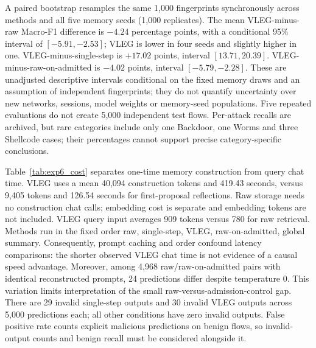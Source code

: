 A paired bootstrap resamples the same 1,000 fingerprints synchronously across methods and all five memory seeds (1,000 replicates). The mean VLEG-minus-raw Macro-F1 difference is $-4.24$ percentage points, with a conditional 95\% interval of $[-5.91,-2.53]$; VLEG is lower in four seeds and slightly higher in one. VLEG-minus-single-step is $+17.02$ points, interval $[13.71,20.39]$. VLEG-minus-raw-on-admitted is $-4.02$ points, interval $[-5.79,-2.28]$. These are unadjusted descriptive intervals conditional on the fixed memory draws and an assumption of independent fingerprints; they do not quantify uncertainty over new networks, sessions, model weights or memory-seed populations. Five repeated evaluations do not create 5,000 independent test flows. Per-attack recalls are archived, but rare categories include only one Backdoor, one Worms and three Shellcode cases; their percentages cannot support precise category-specific conclusions.

Table~\ref{tab:exp6_cost} separates one-time memory construction from query chat time. VLEG uses a mean 40,094 construction tokens and 419.43 seconds, versus 9,405 tokens and 126.54 seconds for first-proposal reflections. Raw storage needs no construction chat calls; embedding cost is separate and embedding tokens are not included. VLEG query input averages 909 tokens versus 780 for raw retrieval. Methods run in the fixed order raw, single-step, VLEG, raw-on-admitted, global summary. Consequently, prompt caching and order confound latency comparisons: the shorter observed VLEG chat time is not evidence of a causal speed advantage. Moreover, among 4,968 raw/raw-on-admitted pairs with identical reconstructed prompts, 24 predictions differ despite temperature $0$. This variation limits interpretation of the small raw-versus-admission-control gap. There are 29 invalid single-step outputs and 30 invalid VLEG outputs across 5,000 predictions each; all other conditions have zero invalid outputs. False positive rate counts explicit malicious predictions on benign flows, so invalid-output counts and benign recall must be considered alongside it.

